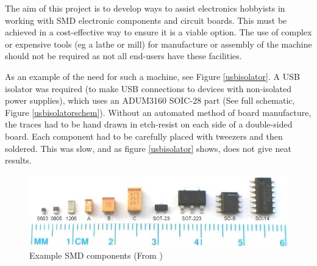 The aim of this project is to develop ways to assist electronics 
hobbyists in working with SMD electronic components and circuit boards.
This must be achieved in a cost-effective way to ensure it is a viable
option. The use of complex or expensive tools (eg a lathe or mill) for
manufacture or assembly of the machine should not be required as not all
end-users have these facilities.

 




As an example of the need for such a machine, see Figure \ref{usbisolator}. A USB isolator was required (to make USB connections to devices with non-isolated
power supplies), which uses an ADUM3160 SOIC-28 part (See full schematic, Figure \ref{usbisolatorschem}). Without an automated method of board manufacture, the
traces had to be hand drawn in etch-resist on each side of a double-sided board. Each component had to be carefully
placed with tweezers and then soldered. This was slow, and as figure \ref{usbisolator} shows, does not give
neat results.


\begin{figure}[ht!]
\centering
\includegraphics[width=150mm]{resources/SMDsizes.jpg}
\caption{Example SMD components (From \cite{fpga4fun})}
\label{overflow}
\end{figure}

